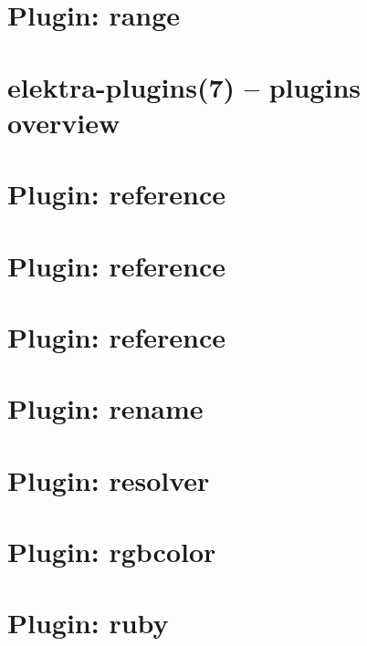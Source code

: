 \let\mypdfximage\pdfximage\def\pdfximage{\immediate\mypdfximage}\documentclass[twoside]{book}
\newcommand{\+}{\discretionary{\mbox{\scriptsize$\hookleftarrow$}}{}{}}
\begin{document}
\chapter{Plugin\+: range}
\label{md_src_plugins_range_README}

\chapter{elektra-\/plugins(7) -- plugins overview}
\label{src_plugins_README_md}

\chapter{Plugin\+: reference}
\label{md_src_plugins_reference_examples_alternative_README}

\chapter{Plugin\+: reference}
\label{md_src_plugins_reference_examples_complex_README}

\chapter{Plugin\+: reference}
\label{md_src_plugins_reference_README}

\chapter{Plugin\+: rename}
\label{md_src_plugins_rename_README}

\chapter{Plugin\+: resolver}
\label{md_src_plugins_resolver_README}

\chapter{Plugin\+: rgbcolor}
\label{md_src_plugins_rgbcolor_README}

\chapter{Plugin\+: ruby}
\label{md_src_plugins_ruby_README}

\end{document}
